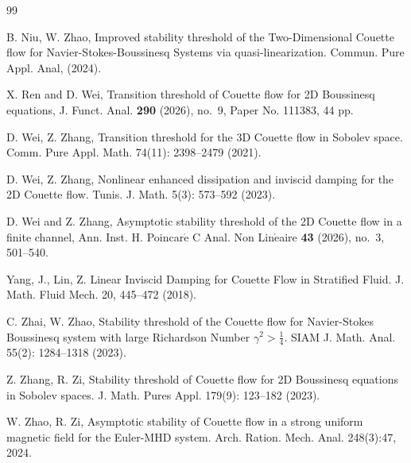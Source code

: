 \documentclass[12pt]{article}
\numberwithin{equation}{section}
\begin{document}
\begin{thebibliography}{99}
  		
  		B. Niu, W. Zhao, Improved stability threshold of the Two-Dimensional Couette flow for Navier-Stokes-Boussinesq Systems via quasi-linearization.  Commun. Pure Appl. Anal, (2024).
  		
		
		X. Ren and D. Wei, Transition threshold of Couette flow for 2D Boussinesq equations, J. Funct. Anal. {\bf 290} (2026), no.~9, Paper No. 111383, 44 pp.
		
  		D. Wei, Z. Zhang, Transition threshold for the 3D Couette flow in Sobolev space. Comm. Pure Appl. Math. 74(11): 2398--2479  (2021).
  		
  		D. Wei, Z. Zhang, Nonlinear enhanced dissipation and inviscid damping for the 2D Couette flow. Tunis. J. Math. 5(3): 573–592 (2023).
  		
  		D. Wei and Z. Zhang, Asymptotic stability threshold of the 2D Couette flow in a finite channel, Ann. Inst. H. Poincar$\mathrm{\acute{e}}$  C Anal. Non Lin$\mathrm{\acute{e}}$aire {\bf 43} (2026), no.~3, 501--540.

        Yang, J., Lin, Z. Linear Inviscid Damping for Couette Flow in Stratified Fluid. J. Math. Fluid Mech. 20, 445–472 (2018).
        
  		C. Zhai, W. Zhao, Stability threshold of the Couette flow for Navier-Stokes Boussinesq system with large Richardson Number $\gamma^2 > \frac 14$. SIAM J. Math. Anal. 55(2): 1284–1318 (2023).
  		
  		Z. Zhang, R. Zi, Stability threshold of Couette flow for 2D Boussinesq equations in Sobolev spaces. J. Math. Pures Appl. 179(9): 123–182 (2023).
  		
  	
  		
  		
  		W. Zhao, R. Zi, Asymptotic stability of Couette flow in a strong uniform magnetic field for the Euler-MHD system. Arch. Ration. Mech. Anal. 248(3):47, 2024.
  		
  		
 		

        
  	\end{thebibliography}	
    
\end{document}
